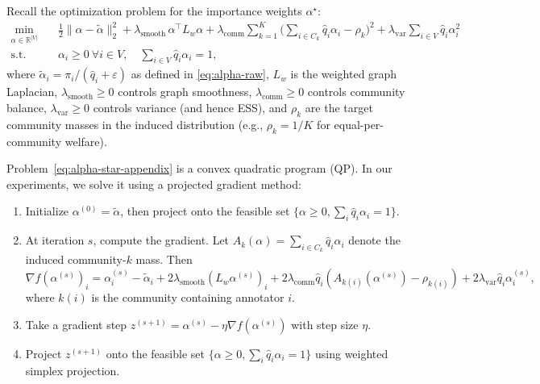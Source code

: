 \documentclass{article}
\theoremstyle{plain}
\theoremstyle{definition}
\theoremstyle{remark}
\begin{document}
Recall the optimization problem for the importance weights $\alpha^\star$:
\begin{equation}
\begin{aligned}
    \min_{\alpha \in \mathbb{R}^{|V|}}
    \quad &
    \frac{1}{2} \|\alpha - \tilde\alpha\|_2^2
    + \lambda_{\text{smooth}} \, \alpha^\top L_w \alpha
    + \lambda_{\text{comm}} \sum_{k=1}^{K}
      \Big( \sum_{i \in C_k} \hat q_i \alpha_i - \rho_k \Big)^2
    + \lambda_{\text{var}} \sum_{i \in V} \hat q_i \alpha_i^2
    \\
    \text{s.t.}\quad
    & \alpha_i \ge 0 \ \forall i \in V,
    \quad
    \sum_{i \in V} \hat q_i \alpha_i = 1,
\end{aligned}
\label{eq:alpha-star-appendix}
\end{equation}
where $\tilde\alpha_i = \pi_i / (\hat q_i + \varepsilon)$ as defined in
\eqref{eq:alpha-raw}, $L_w$ is the weighted graph Laplacian, $\lambda_{\text{smooth}} \ge 0$
controls graph smoothness, $\lambda_{\text{comm}} \ge 0$ controls community
balance, $\lambda_{\text{var}} \ge 0$ controls variance (and hence ESS),
and $\rho_k$ are the target community masses in the induced distribution
(e.g., $\rho_k = 1/K$ for equal-per-community welfare).

Problem~\eqref{eq:alpha-star-appendix} is a convex quadratic program (QP).
In our experiments, we solve it using a projected gradient method:

\begin{enumerate}
    \item Initialize $\alpha^{(0)} = \tilde\alpha$, then project onto
    the feasible set $\{\alpha \ge 0, \sum_i \hat q_i \alpha_i = 1\}$.
    \item At iteration $s$, compute the gradient. Let
    $A_k(\alpha) = \sum_{i \in C_k} \hat q_i \alpha_i$ denote the induced
    community-$k$ mass. Then
    \begin{equation}
        \nabla f(\alpha^{(s)})_i
        = \alpha_i^{(s)} - \tilde\alpha_i
        + 2 \lambda_{\text{smooth}} (L_w \alpha^{(s)})_i
        + 2 \lambda_{\text{comm}} \hat q_i (A_{k(i)}(\alpha^{(s)}) - \rho_{k(i)})
        + 2 \lambda_{\text{var}} \hat q_i \alpha_i^{(s)},
    \end{equation}
    where $k(i)$ is the community containing annotator $i$.
    \item Take a gradient step
    $z^{(s+1)} = \alpha^{(s)} - \eta \nabla f(\alpha^{(s)})$ with step size
    $\eta$.
    \item Project $z^{(s+1)}$ onto the feasible set
    $\{\alpha \ge 0, \sum_i \hat q_i \alpha_i = 1\}$ using weighted simplex
    projection.
\end{enumerate}
\end{document}

